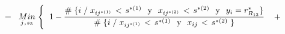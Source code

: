 \documentclass[
  11pt,
  a4paper,
]{article}
\begin{document}
\begin{gather*}
=\hspace{0.2cm}   \underset{j \hspace{0.02cm},\hspace{0.02cm} s_3}  {Min} \hspace{0.1cm} \Biggl\{ \hspace{0.2cm}     1 - \dfrac{\# \hspace{0.1 cm}\lbrace i \hspace{0.1 cm}/\hspace{0.1 cm}  x_{ij^{*(1)}} \hspace{0.05cm}   < \hspace{0.05cm} s^{*(1)} \hspace{0.25 cm}\text{y}\hspace{0.25 cm} x_{ij^{*(2)}} \hspace{0.05cm}   < \hspace{0.05cm} s^{*(2)} \hspace{0.25 cm}\text{y}\hspace{0.25 cm} y_i = r^*_{R_{13}} \rbrace}{\# \hspace{0.1 cm}\lbrace i \hspace{0.1 cm} / \hspace{0.1 cm}  x_{ij^{*(1)}} \hspace{0.05cm}   < \hspace{0.05cm} s^{*(1)} \hspace{0.25 cm}\text{y}\hspace{0.25 cm} x_{ij} \hspace{0.05cm}   < \hspace{0.05cm} s^{*(2)}  \hspace{0.1 cm} \rbrace }      \hspace{0.4cm} +  \\ \\

\end{gather*}
\end{document}
